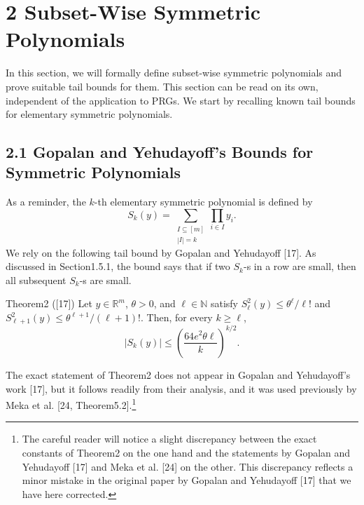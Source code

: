 \section*{2 Subset-Wise Symmetric Polynomials}
In this section, we will formally define subset-wise symmetric polynomials and prove suitable tail bounds for them. This section can be read on its own, independent of the application to PRGs. We start by recalling known tail bounds for elementary symmetric polynomials.
\subsection*{2.1 Gopalan and Yehudayoff's Bounds for Symmetric Polynomials}
As a reminder, the $k$-th elementary symmetric polynomial is defined by
\[
S_k(y)=\sum_{\substack{I\subseteq[m]\\|I|=k}}\prod_{i\in I}y_i.
\]
We rely on the following tail bound by Gopalan and Yehudayoff [17]. As discussed in Section1.5.1, the bound says that if two $S_k$-s in a row are small, then all subsequent $S_k$-s are small.
\begin{authorclaim}{Theorem2 ([17])}
Let $y\in\mathbb R^m$, $\theta>0$, and $\ell\in\mathbb N$ satisfy $S_\ell^2(y)\le\theta^\ell/\ell!$ and $S_{\ell+1}^2(y)\le\theta^{\ell+1}/(\ell+1)!$. Then, for every $k\ge\ell$,
\[
|S_k(y)|\le\left(\frac{64e^2\theta\ell}{k}\right)^{k/2}.
\]
\end{authorclaim}
The exact statement of Theorem2 does not appear in Gopalan and Yehudayoff's work [17], but it follows readily from their analysis, and it was used previously by Meka et al. [24, Theorem5.2].\footnote{The careful reader will notice a slight discrepancy between the exact constants of Theorem2 on the one hand and the statements by Gopalan and Yehudayoff [17] and Meka et al. [24] on the other. This discrepancy reflects a minor mistake in the original paper by Gopalan and Yehudayoff [17] that we have here corrected.}
